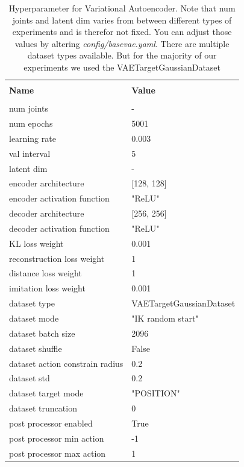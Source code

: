 \begin{table}[h]
    \label{tab:VAE_Hyperparameters}
    \begin{center}
        \begin{tabular}{ l | l }
        \hline \\
        \textbf{Name} & \textbf{Value} \\
        \hline \\
        num joints & - \\
        num epochs & 5001 \\
        learning rate & 0.003 \\
        val interval & 5 \\
        latent dim & - \\
        encoder architecture & [128, 128] \\
        encoder activation function & "ReLU" \\
        decoder architecture & [256, 256] \\
        decoder activation function & "ReLU" \\
        KL loss weight & 0.001 \\
        reconstruction loss weight & 1 \\
        distance loss weight & 1 \\
        imitation loss weight & 0.001 \\
        dataset type & VAETargetGaussianDataset \\
        dataset mode & "IK random start" \\
        dataset batch size & 2096 \\
        dataset shuffle & False \\
        dataset action constrain radius & 0.2 \\
        dataset std & 0.2 \\
        dataset target mode & "POSITION" \\
        dataset truncation & 0  \\
        post processor enabled & True \\
        post processor min action & -1 \\
        post processor max action & 1 
        \end{tabular}
    \end{center}
    \caption[VAE Hyperparameter]{Hyperparameter for Variational Autoencoder. Note that num joints and latent dim varies from between different types of experiments and is therefor not fixed. You can adjust those values by altering \textit{config/base\textunderscore vae.yaml}. There are multiple dataset types available. But for the majority of our experiments we used the VAETargetGaussianDataset}
\end{table}

